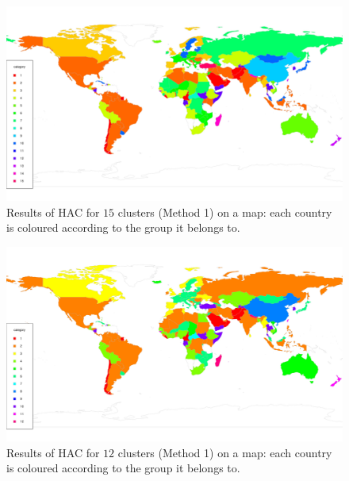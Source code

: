 \documentclass[a4paper,12pt]{article}
\numberwithin{equation}{section}
\begin{document}
\begin{figure}[t!]
\begin{minipage}[t]{0.98\textwidth}
\includegraphics[width=\textwidth]{plots/14days/map_15cl}
\caption{Results of HAC for $15$ clusters (Method 1) on a map: each country is coloured according to the group it belongs to.}\label{fig:map_15cl}
\end{minipage}
\end{figure}


\newpage 
\FloatBarrier

\begin{figure}[t!]
\begin{minipage}[t]{0.98\textwidth}
\includegraphics[width=\textwidth]{plots/14days/map_12cl}
\caption{Results of HAC for $12$ clusters (Method 1) on a map: each country is coloured according to the group it belongs to.}
\end{minipage}
\end{figure}
\end{document}
